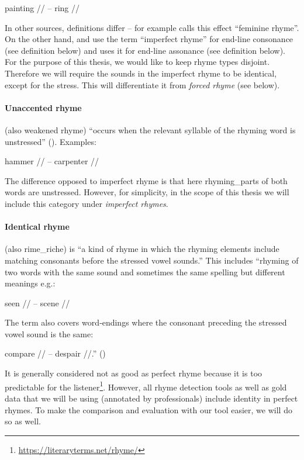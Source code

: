 painting // -- ring //

\noindent In other sources, definitions differ -- for example \cite{literarydevices2020} calls this effect ``feminine rhyme''.  On the other hand, \cite{oxforddict2008literary} and \cite{britannica} use the term ``imperfect rhyme'' for end-line consonance (see definition below) and \cite{vanphonological} uses it for end-line assonance (see definition below). For the purpose of this thesis, we would like to keep rhyme types disjoint. Therefore we will require the sounds in the imperfect rhyme to be identical, except for the stress. This will differentiate it from \textit{forced rhyme} (see below).


\paragraph{Unaccented rhyme} (also weakened rhyme) ``occurs when the relevant syllable of the rhyming word is unstressed'' (\cite{britannica}). Examples: 

hammer // -- carpenter //

\noindent The difference opposed to imperfect rhyme is that here \gls{rhyming_part}s of both words are unstressed. However, for simplicity, in the scope of this thesis we will include this category under \textit{imperfect rhymes}.


\paragraph{Identical rhyme} (also \gls{rime_riche}) is ``a kind of rhyme in which the rhyming elements include matching consonants before the stressed vowel sounds.'' This includes ``rhyming of two words with the same sound and sometimes the same spelling but different meanings e.g.:

 seen // -- scene //
 
 The term also covers word‐endings where the consonant preceding the stressed vowel sound is the same: 
 
 compare // -- despair //.'' (\cite{oxforddict2008literary})
 
 It is generally considered not as good as perfect rhyme because it is too predictable for the listener\footnote{\url{https://literaryterms.net/rhyme/}}. However, all rhyme detection tools as well as gold data that we will be using (annotated by professionals) include identity in perfect rhymes. To make the comparison and evaluation with our tool easier, we will do so as well.

